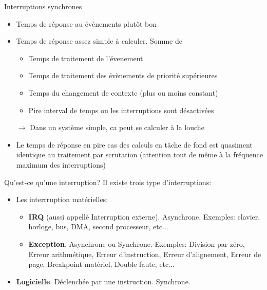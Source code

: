 \begin{frame}{Interruptions synchrones}
  \begin{itemize}
  \item Temps de réponse au évènements plutôt bon
  \item Temps de réponse assez simple à calculer. Somme de
    \begin{itemize}
    \item Temps de traitement de l'évenement
    \item Temps de traitement des évènements de priorité supérieures
    \item Temps du changement de contexte (plus ou moins constant)
    \item Pire interval de temps ou les interruptions sont désactivées
    \end{itemize}
  \item[$\rightarrow$] Dans  un système simple, ca peut  se calculer à
    la louche
  \item Le  temps de réponse en pire  cas des calculs en  tâche de fond
    est quasiment  identique au traitement  par scrutation (attention
    tout de même à la fréquence maximum des interruptions)
  \end{itemize}
\end{frame}

\begin{frame}{Qu'est-ce qu'une interruption?}
  Il existe trois type d'interruptions:
  \begin{itemize}
  \item Les interrruption matérielles:
    \begin{itemize}
    \item   \textbf{IRQ}   (aussi   appellé   Interruption   externe).
      Asynchrone.   Exemples:  clavier,   horloge,  bus,  DMA,  second
      processeur, etc...
    \item  \textbf{Exception}.   Asynchrone  ou Synchrone.   Exemples:
      Division  par zéro,  Erreur arithmétique,  Erreur d'instruction,
      Erreur d'alignement, Erreur de page, Breakpoint matériel, Double
      faute,  etc...


    \end{itemize}
  \item \textbf{Logicielle}. Déclenchée par une instruction. Synchrone.
  \end{itemize}
\end{frame}

